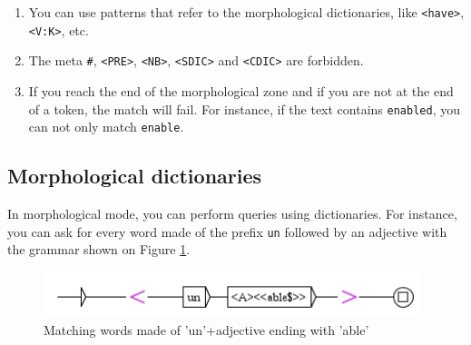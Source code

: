 \begin{enumerate}
    \item You can use patterns that refer to the morphological dictionaries,
    like \verb+<have>+, \verb+<V:K>+, etc. 

    \item The meta \verb+#+, \verb+<PRE>+, \verb+<NB>+, 
    \verb+<SDIC>+ and \verb+<CDIC>+ are forbidden.\index{\verb+#+}
       
     
    
    \item If you reach the end of the morphological zone and if you are not
    at the end of a token, the match will fail. For instance, if the text
    contains \verb+enabled+, you can not only match \verb+enable+.
\end{enumerate}

\subsection{Morphological dictionaries}
In morphological mode, you can perform queries using dictionaries. For
instance, you can ask for every word made of the prefix \verb+un+ followed by an
adjective with the grammar shown on Figure \ref{fig-morpho3}.

\begin{figure}[!ht]
\begin{center}
\includegraphics[width=11cm]{resources/img/fig6-17m.png}
\caption{Matching words made of 'un'+adjective ending with
'able'\label{fig-morpho3}}
\end{center}
\end{figure}

